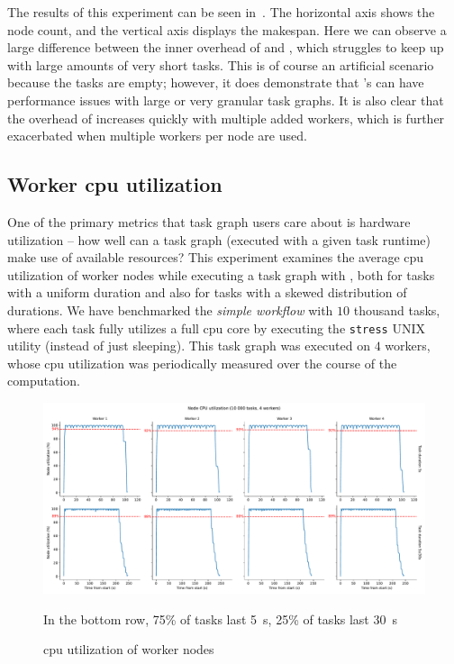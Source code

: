 The results of this experiment can be seen in~. The horizontal axis shows
the node count, and the vertical axis displays the makespan. Here we can observe a large difference
between the inner overhead of \hyperqueue{} and \dask{}, which struggles
to keep up with large amounts of very short tasks. This is of course an artificial scenario because
the tasks are empty; however, it does demonstrate that \dask{}'s can have
performance issues with large or very granular task graphs. It is also clear that the overhead of
\dask{} increases quickly with multiple added workers, which is further exacerbated
when multiple workers per node are used.

\subsection{Worker \gls{cpu} utilization}
\label{sec:hq-cpu-utilization}
One of the primary metrics that task graph users care about is hardware utilization -- how well can
a task graph (executed with a given task runtime) make use of available resources? This experiment
examines the average \gls{cpu} utilization of worker nodes while executing a task
graph with \hyperqueue{}, both for tasks with a uniform duration and also for tasks with
a skewed distribution of durations. We have benchmarked the \emph{simple workflow} with
$10$ thousand tasks, where each task fully utilizes a full
\gls{cpu} core by executing the \texttt{stress} UNIX utility (instead of just
sleeping). This task graph was executed on $4$ workers, whose
\gls{cpu} utilization was periodically measured over the course of the computation.

\begin{figure}[h]
	\centering
	\includegraphics[width=\textwidth]{imgs/hq/charts/scalability-stress-utilization}

	In the bottom row, 75\% of tasks last \SI{5}{\second}, 25\% of tasks last
	\SI{30}{\second} \caption{\gls{cpu} utilization of \hyperqueue{} worker nodes} \label{fig:hq-cpu-utilization}
\end{figure}


